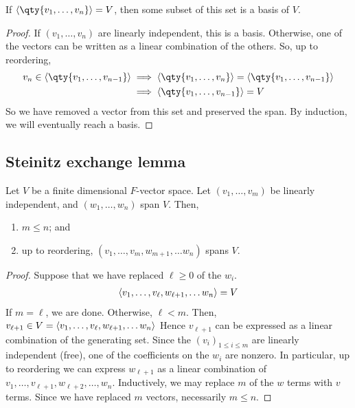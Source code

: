\begin{lemma}
    If $\genset{\qty{v_1, \dots, v_n}} = V$, then some subset of this set is a basis of $V$.
\end{lemma}
\begin{proof}
    If $(v_1, \dots, v_n)$ are linearly independent, this is a basis.
    Otherwise, one of the vectors can be written as a linear combination of the others.
    So, up to reordering,
    \begin{align*}
        v_n \in \genset{\qty{v_1, \dots, v_{n-1}}} &\implies \genset{\qty{v_1, \dots, v_n}} = \genset{\qty{v_1, \dots, v_{n-1}}} \\
        &\implies \genset{\qty{v_1, \dots, v_{n-1}}} = V
    \end{align*}
    So we have removed a vector from this set and preserved the span.
    By induction, we will eventually reach a basis.
\end{proof}

\subsection{Steinitz exchange lemma}
\begin{theorem}
    Let $V$ be a finite dimensional $F$-vector space.
    Let $(v_1, \dots, v_m)$ be linearly independent, and $(w_1, \dots, w_n)$ span $V$.
    Then,
    \begin{enumerate}
        \item $m \leq n$; and
        \item up to reordering, $(v_1, \dots, v_m, w_{m+1}, \dots w_n)$ spans $V$.
    \end{enumerate}
\end{theorem}
\begin{proof}
    Suppose that we have replaced $\ell \geq 0$ of the $w_i$.
    \begin{align*}
        \langle{} v_1, \dots, v_\ell, w_{\ell+1}, \dots w_n \rangle = V
    \end{align*}
    If $m = \ell$, we are done.
    Otherwise, $\ell < m$.
    Then,
    $v_{\ell + 1} \in V = \langle{} v_1, \dots, v_\ell, w_{\ell+1}, \dots w_n \rangle$
    Hence $v_{\ell + 1}$ can be expressed as a linear combination of the generating set.
    Since the $(v_i)_{1 \leq i \leq m}$ are linearly independent (free), one of the coefficients on the $w_i$ are nonzero.
    In particular, up to reordering we can express $w_{\ell+1}$ as a linear combination of $v_1, \dots, v_{\ell + 1}, w_{\ell + 2}, \dots, w_n$.
    Inductively, we may replace $m$ of the $w$ terms with $v$ terms.
    Since we have replaced $m$ vectors, necessarily $m \leq n$.
\end{proof}

